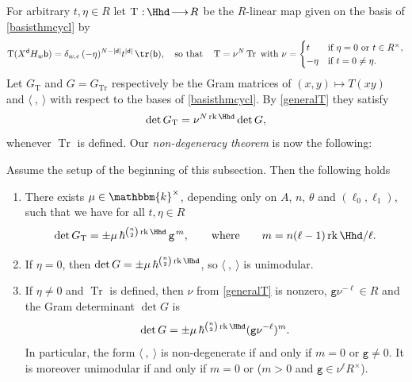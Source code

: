 \documentclass[a4paper,11pt]{amsart}
\def\map#1#2{\,{:}\,#1\!\longrightarrow\!#2}
\let\<\langle
\let\>\rangle
\newcommand{\Tr}{\op{Tr}}
\newcommand{\T}{\op{T}}
\numberwithin{equation}{subsection}
\theoremstyle{definition}
\theoremstyle{theorem}
\theoremstyle{remark}
\newcommand\gcy{\mathtt{g}}
\newcommand\bd{\mathsf{d}}
\newcommand\bb{\mathsf{b}}
\newcommand\op{\operatorname}
\newcommand\kk{\mathbbm{k}}
\begin{document}
For arbitrary $t,\eta\in R$ let $\T\map{\Hhd}R$ be the $R$-linear map given on the basis of \autoref{basisthmcycl} by
\begin{equation}\label{generalT}
  \T(X^{\bd}H_w\bb)=\delta_{w,e}\,(-\eta)^{N-|\bd|}t^{|\bd|}\,\tr(\bb),\quad\text{so that}\quad \T=\nu^{N}\Tr\text{ with } \nu=
  \begin{cases}
  t&\text{if $\eta=0$ or $t\in R^{\times}$},\\
-\eta&\text{if $t=0\neq\eta$.}
  \end{cases}
\end{equation}
  Let $G_{\T}$ and $G=G_{\Tr}$ respectively be
the Gram matrices of $(x,y)\mapsto T(xy)$ and $\<\ ,\ \>$ with respect to the
bases of \autoref{basisthmcycl}. By \autoref{generalT} they satisfy
\begin{equation}\label{GTG}
  \det G_{\T}=\nu^{N\op{rk}\Hhd}\det G,
\end{equation}
whenever $\Tr$ is defined. Our \emph{non-degeneracy theorem} is now the following:
\begin{Theorem}\label{T:summary}
Assume the setup of the beginning of this subsection. Then the following holds
\begin{enumerate}
\item There exists $\mu\in\kk^{\times}$, depending only on $A$, $n$, $\theta$ and
  $(\ell_0,\ell_1)$, such that we have for all $t,\eta\in R$
  \[
    \det G_{\T}=\pm\mu\,\hbar^{\binom{n}{2}\op{rk}\Hhd}\,\gcy^{\,m},
    \qquad\text{where}\qquad m=n(\ell-1)\op{rk}\Hhd/\ell.
  \]
  \item If $\eta=0$, then
  $\det G=\pm\mu\,\hbar^{\binom{n}{2}\op{rk}\Hhd}$, so $\<\ ,\ \>$ is unimodular.
 \item  If $\eta\neq0$ and $\Tr$ is defined, then $\nu$ from \autoref{generalT} is nonzero, $\gcy\nu^{-\ell}\in R$ and the Gram determinant $\det G$ is
 \begin{equation}\label{madeleine}
 \det G=\pm\mu\,\hbar^{\binom{n}{2}\op{rk}\Hhd}(\gcy\nu^{-\ell})^{m}.
 \end{equation}
In particular, the  form $\<\ ,\ \>$ is non-degenerate if and only if
  $m=0$ or $\gcy\neq0$. It is moreover unimodular if and only if $m=0$ or  ($m>0$ and $\gcy\in\nu^{\ell}R^{\times}$).
  \end{enumerate}
\end{Theorem}
\end{document}
